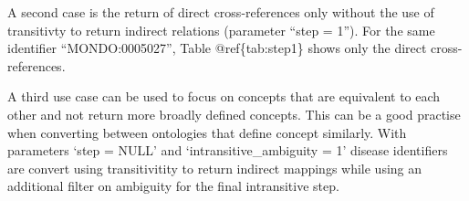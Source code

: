 \documentclass[9pt,a4paper,]{extarticle}
\begin{document}
A second case is the return of direct cross-references only without the use of transitivty to return indirect relations (parameter ``step = 1''). For the same identifier ``MONDO:0005027'', Table @ref\{tab:step1\} shows only the direct cross-references.

\begin{table}

\caption{\label{tab:step1}Conversion of 'MONDO:0005027' (epilepsy) returning only direct cross-references using parameters 'step = 1'}
\centering
{}
\end{table}

A third use case can be used to focus on concepts that are equivalent to each other and not return more broadly defined concepts. This can be a good practise when converting between ontologies that define concept similarly. With parameters `step = NULL' and `intransitive\_ambiguity = 1' disease identifiers are convert using transitivitity to return indirect mappings while using an additional filter on ambiguity for the final intransitive step.
\end{document}
